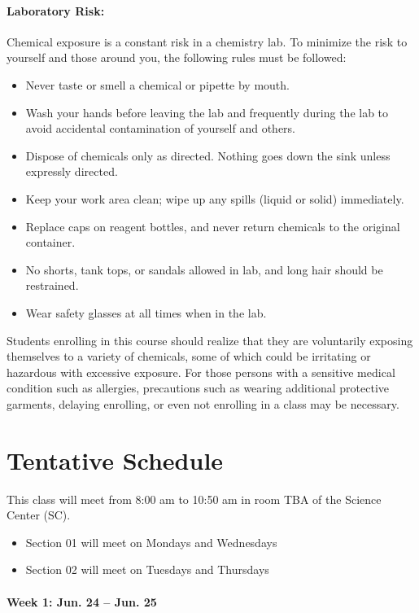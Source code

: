 \documentclass[12pt, letterpaper]{article}
\begin{document}
\paragraph{Laboratory Risk:}
Chemical exposure is a constant risk in a chemistry lab. To minimize the risk to yourself and those around you, the following rules must be followed:
\begin{itemize}
	\item Never taste or smell a chemical or pipette by mouth.
	\item Wash your hands before leaving the lab and frequently during the lab to avoid accidental contamination of yourself and others.
	\item Dispose of chemicals only as directed. Nothing goes down the sink unless expressly directed.
	\item Keep your work area clean; wipe up any spills (liquid or solid) immediately.
	\item Replace caps on reagent bottles, and never return chemicals to the original container.
	\item No shorts, tank tops, or sandals allowed in lab, and long hair should be restrained.
	\item Wear safety glasses at all times when in the lab.
\end{itemize}
Students enrolling in this course should realize that they are voluntarily exposing themselves to a variety of chemicals, some of which could be irritating or hazardous with excessive exposure.  For those persons with a sensitive medical condition such as allergies, precautions such as wearing additional protective garments, delaying enrolling, or even not enrolling in a class may be necessary.

\section*{Tentative Schedule}
This class will meet from 8:00 am to 10:50 am in room TBA of the Science Center (SC).
\begin{itemize}
\item Section 01 will meet on Mondays and Wednesdays
\item Section 02 will meet on Tuesdays and Thursdays
\end{itemize}

\paragraph*{Week 1: Jun. 24 -- Jun. 25}~
\end{document}
